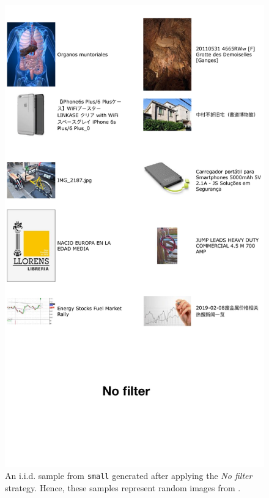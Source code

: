 \begin{figure}
    \centering
    \includegraphics[width=0.9\linewidth]{figures/appx-no_filter.pdf}
    \caption{An i.i.d. sample from {\small \texttt{small}} \pool generated after applying the \emph{No filter} strategy. Hence, these samples represent random images from \pool.}
    \label{fig:no_filter}
\end{figure}

